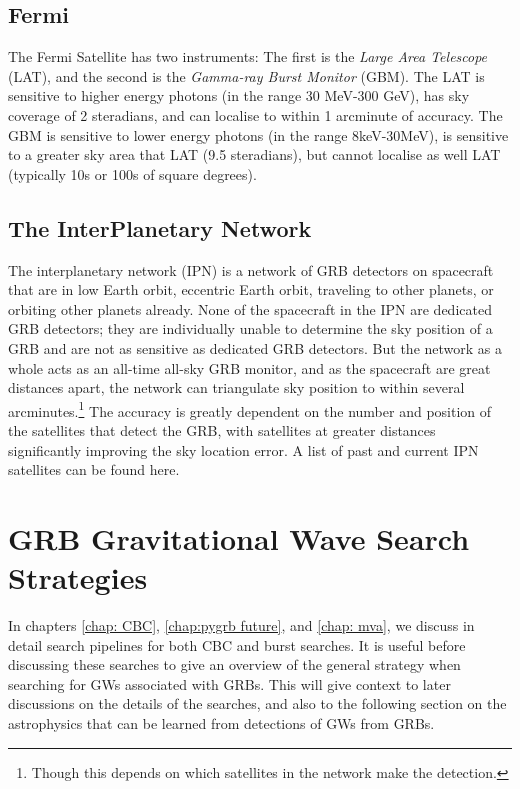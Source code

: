 \documentclass[11pt]{cuthesis}
\begin{document}
\subsection{Fermi}
The Fermi Satellite\cite{fermi} has two instruments: The first is the \textit{Large Area Telescope} (LAT), and the second is the \textit{Gamma-ray Burst Monitor} (GBM). The LAT is sensitive to higher energy photons (in the range 30 MeV-300 GeV), has sky coverage of  2 steradians, and can localise to within 1 arcminute of accuracy. The GBM is sensitive to lower energy photons (in the range 8keV-30MeV), is sensitive to a greater sky area that LAT (9.5 steradians), but cannot localise as well LAT (typically 10s or 100s of square degrees). 

\subsection{The InterPlanetary Network}
The interplanetary network (IPN)\cite{IPN} is a network of GRB detectors on spacecraft that are in low Earth orbit, eccentric Earth orbit, traveling to other planets, or orbiting other planets already. None of the spacecraft in the IPN are dedicated GRB detectors; they are individually unable to determine the sky position of a GRB and are not as sensitive as dedicated GRB detectors. But the network as a whole acts as an all-time all-sky GRB monitor, and as the spacecraft are great distances apart, the network can triangulate sky position to within several arcminutes.\footnote{Though this depends on which satellites in the network make the detection.} The accuracy is greatly dependent on the number and position of the satellites that detect the GRB, with satellites at greater distances significantly improving the sky location error. A list of past and current IPN satellites can be found here.\cite{IPN_list}

\section{GRB Gravitational Wave Search Strategies}
In chapters \ref{chap: CBC}, \ref{chap:pygrb future}, and \ref{chap: mva}, we discuss in detail search pipelines for both CBC and burst searches. It is useful before discussing these searches to give an overview of the general strategy when searching for GWs associated with GRBs. This will give context to later discussions on the details of the searches, and also to the following section on the astrophysics that can be learned from detections of GWs from GRBs. 
\end{document}
